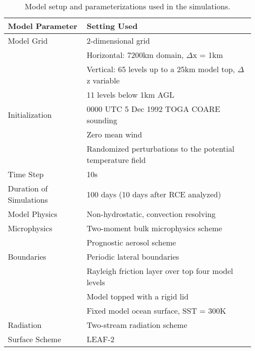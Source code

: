 \begin{table}[t]
\caption{Model setup and parameterizations used in the simulations.}\label{ramstable}
\begin{tabular}{ll}
\hline\hline
Model Parameter & Setting Used\\
\hline
 Model Grid & 2-dimensional grid\\
    & Horizontal: 7200km domain, $\Delta$x = 1km \\
    & Vertical: 65 levels up to a 25km model top, $\Delta$z variable  \\
    & 11 levels below 1km AGL\\
Initialization & 0000 UTC 5 Dec 1992 TOGA COARE sounding\\
	&Zero mean wind\\
  & Randomized perturbations to the potential temperature field\\
  Time Step  &  10s\\
  Duration of Simulations & 100 days  (10 days after RCE analyzed)\\
  Model Physics & Non-hydrostatic, convection resolving \\
  Microphysics & Two-moment bulk microphysics scheme \citep{Meyers:1997p81}\\
 & Prognostic aerosol scheme \citep{Saleeby:2004p882} \\
  Boundaries & Periodic lateral boundaries \\
    & Rayleigh friction layer over top four model levels \\
    & Model topped with a rigid lid \\
    & Fixed model ocean surface, SST = 300K\\
Radiation &   Two-stream radiation scheme \citep{Harrington:1999p624} \\ 
    Surface Scheme & LEAF-2 \citep{Walko:2000p8575} \\
    
\hline
\end{tabular}
\end{table}

